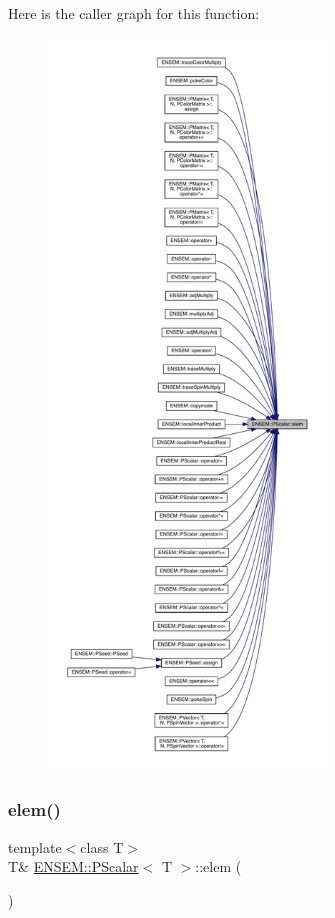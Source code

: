 Here is the caller graph for this function\+:\nopagebreak
\begin{figure}[H]
\begin{center}
\leavevmode
\includegraphics[height=550pt]{d3/d27/classENSEM_1_1PScalar_aac65f47beae4fa376f101587344c1589_icgraph}
\end{center}
\end{figure}
\mbox{\label{classENSEM_1_1PScalar_aac65f47beae4fa376f101587344c1589}} 
\subsubsection{\texorpdfstring{elem()}{elem()}\hspace{0.1cm}{\footnotesize\ttfamily [2/4]}}
{\footnotesize\ttfamily template$<$class T$>$ \\
T\& \mbox{\hyperlink{classENSEM_1_1PScalar}{E\+N\+S\+E\+M\+::\+P\+Scalar}}$<$ T $>$\+::elem (\begin{DoxyParamCaption}{ }\end{DoxyParamCaption})\hspace{0.3cm}{\ttfamily [inline]}}

